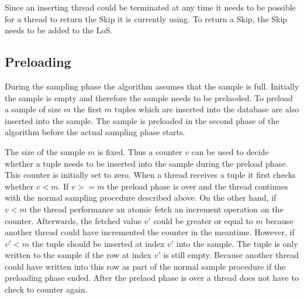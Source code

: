 \documentclass[sigconf,nonacm]{acmart}
\begin{document}
        Since an inserting thread could be terminated at any time it needs to be possible for a thread to return the Skip it is currently using. To return a Skip, the Skip needs to be added to the LoS.

    \subsection{Preloading}
        During the sampling phase the algorithm assumes that the sample is full. Initially the sample is empty and therefore the sample needs to be prelaoded. To preload a sample of size $m$ the first $m$ tuples which are inserted into the database are also inserted into the sample. The sample is preloaded in the second phase of the algorithm before the actual sampling phase starts.

        The size of the sample $m$ is fixed. Thus a counter $v$ can be used to decide whether a tuple needs to be inserted into the sample during the preload phase. This counter is initially set to zero. When a thread receives a tuple it first checks whether $v<m$. If $v>=m$ the preload phase is over and the thread continues with the normal sampling procedure described above. On the other hand, if $v<m$ the thread performance an atomic fetch an increment operation on the counter. Afterwards, the fetched value $v'$ could be greater or equal to $m$ because another thread could have incremented the counter in the meantime. However, if $v'<m$ the tuple should be inserted at index $v'$ into the sample. The tuple is only written to the sample if the row at index $v'$ is still empty. Because another thread could have written into this row as part of the normal sample procedure if the preloading phase ended. After the prelaod phase is over a thread does not have to check to counter again.
        
\end{document}
